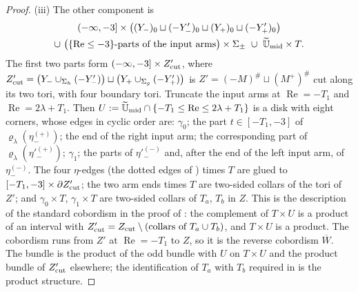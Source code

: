 \documentclass[11pt]{amsart}
\theoremstyle{definition}
\theoremstyle{remark}
\theoremstyle{plain}
\numberwithin{equation}{section}
\begin{document}
\begin{proof}
(iii) The other component is
\begin{multline*}
(-\infty,-3]\times\bigl((Y_-)_0\sqcup(-Y'_-)_0\sqcup(Y_+)_0\sqcup(-Y'_+)_0\bigr)\\
\cup\ \bigl(\{\operatorname{Re}\le-3\}\text{-parts of the input arms}\bigr)\times\Sigma_\pm
\ \cup\ \widetilde{\mathbb U}_{\rm mid}\times T .
\end{multline*}
The first two parts form $(-\infty,-3]\times Z'_{\rm cut}$, where
$Z'_{\rm cut}=\bigl(Y_-\cup_{\Sigma_h}(-Y'_-)\bigr)\sqcup\bigl(Y_+\cup_{\Sigma_g}(-Y'_+)\bigr)$ is
$Z'=(-M)^\#\sqcup(M^+)^\#$ cut along its two tori, with four boundary tori. Truncate
the input arms at $\operatorname{Re}=-T_1$ and $\operatorname{Re}=2\lambda+T_1$. Then
$U:=\widetilde{\mathbb U}_{\rm mid}\cap\{-T_1\le\operatorname{Re}\le2\lambda+T_1\}$ is a disk with eight
corners, whose edges in cyclic order are: $\gamma_0$; the part $t\in[-T_1,-3]$ of
$\varrho_\lambda(\eta^{(+)}_-)$; the end of the right input arm; the corresponding part of
$\varrho_\lambda(\eta'^{(+)}_-)$; $\gamma_1$; the parts of $\eta'^{(-)}_-$ and, after the end of
the left input arm, of $\eta^{(-)}_-$. The four $\eta$-edges (the dotted edges of
\cite[Figure~4]{KM-unknot}) times $T$ are glued to $[-T_1,-3]\times\partial Z'_{\rm cut}$;
the two arm ends times $T$ are two-sided collars of the tori of $Z'$; and
$\gamma_0\times T$, $\gamma_1\times T$ are two-sided collars of $T_a$, $T_b$ in $Z$. This is
the description of the standard cobordism in the proof of
\cite[Theorem~5.6]{KM-unknot}: the complement of $T\times U$ is a product of an interval
with $Z'_{\rm cut}=Z_{\rm cut}\setminus(\text{collars of }T_a\cup T_b)$, and $T\times U$ is a
product. The cobordism runs from $Z'$ at $\operatorname{Re}=-T_1$ to $Z$, so it is the
reverse cobordism $\overline W$. The bundle is the product of the odd bundle with $U$
on $T\times U$ and the product bundle of $Z'_{\rm cut}$ elsewhere; the identification of
$T_a$ with $T_b$ required in \cite[Section~5.3]{KM-unknot} is the product structure.


\end{proof}
\end{document}
